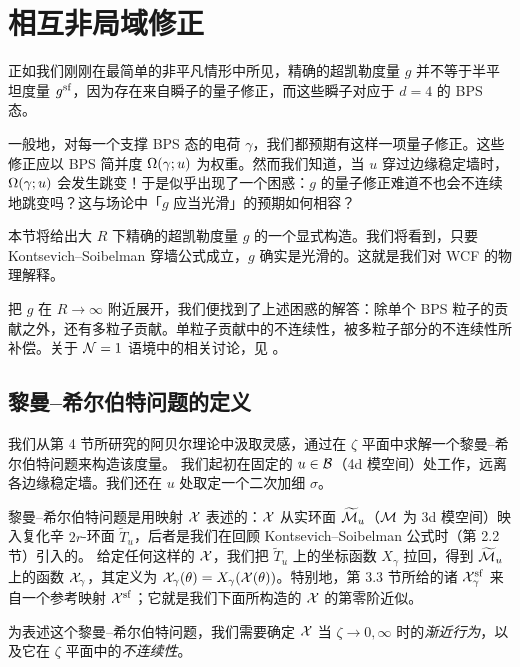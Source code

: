 
\section{相互非局域修正} \label{sec:constructing-moduli}

正如我们刚刚在最简单的非平凡情形中所见，精确的超凯勒度量 $g$ 并不等于半平坦度量 $g^{\mathrm{sf}}$，因为存在来自瞬子的量子修正，而这些瞬子对应于 $d=4$ 的 BPS 态。

一般地，对每一个支撑 BPS 态的电荷 $\gamma$，我们都预期有这样一项量子修正。这些修正应以 BPS 简并度 $\Omega(\gamma;u)$ 为权重。然而我们知道，当 $u$ 穿过边缘稳定墙时，$\Omega(\gamma;u)$ 会发生跳变！于是似乎出现了一个困惑：$g$ 的量子修正难道不也会不连续地跳变吗？这与场论中「$g$ 应当光滑」的预期如何相容？

本节将给出大 $R$ 下精确的超凯勒度量 $g$ 的一个显式构造。我们将看到，只要 Kontsevich--Soibelman 穿墙公式成立，$g$ 确实是光滑的。这就是我们对 WCF 的物理解释。

把 $g$ 在 $R\to\infty$ 附近展开，我们便找到了上述困惑的解答：除单个 BPS 粒子的贡献之外，还有多粒子贡献。单粒子贡献中的不连续性，被多粒子部分的不连续性所补偿。关于 $\mathcal{N}=1$ 语境中的相关讨论，见 \cite{GarciaEtxebarria:2007zv}。

\subsection{黎曼--希尔伯特问题的定义} \label{sec:defining-rh}

我们从第 4 节所研究的阿贝尔理论中汲取灵感，通过在 $\zeta$ 平面中求解一个黎曼--希尔伯特问题来构造该度量。%
我们起初在固定的 $u\in\mathcal{B}$（4d 模空间）处工作，远离各边缘稳定墙。我们还在 $u$ 处取定一个二次加细 $\sigma$。

黎曼--希尔伯特问题是用映射 $\mathcal{X}$ 表述的：$\mathcal{X}$ 从实环面 $\widetilde{\mathcal{M}}_u$（$\mathcal{M}$ 为 3d 模空间）映入复化辛 $2r$-环面 $\tilde T_u$，后者是我们在回顾 Kontsevich--Soibelman 公式时（第 2.2 节）引入的。%
给定任何这样的 $\mathcal{X}$，我们把 $\tilde T_u$ 上的坐标函数 $X_\gamma$ 拉回，得到 $\widetilde{\mathcal{M}}_u$ 上的函数 $\mathcal{X}_\gamma$，其定义为 $\mathcal{X}_\gamma(\theta) = X_\gamma(\mathcal{X}(\theta))$。特别地，第 3.3 节所给的诸 $\mathcal{X}^{\mathrm{sf}}_\gamma$ 来自一个参考映射 $\mathcal{X}^{\mathrm{sf}}$；它就是我们下面所构造的 $\mathcal{X}$ 的第零阶近似。%

为表述这个黎曼--希尔伯特问题，我们需要确定 $\mathcal{X}$ 当 $\zeta\to0,\infty$ 时的\emph{渐近行为}，以及它在 $\zeta$ 平面中的\emph{不连续性}。

